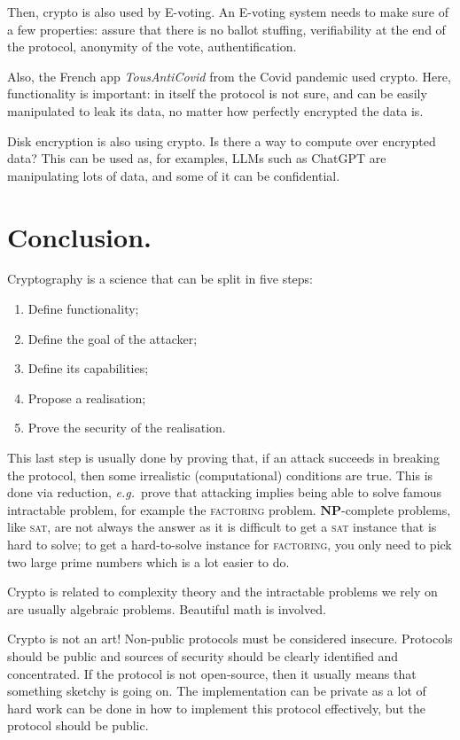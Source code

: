 \documentclass[./main]{subfiles}
\begin{document}
  Then, crypto is also used by E-voting.
  An E-voting system needs to make sure of a few properties:
  assure that there is no ballot stuffing,
  verifiability at the end of the protocol,
  anonymity of the vote,
  authentification.

  Also, the French app \textit{TousAntiCovid} from the Covid pandemic used crypto.
  Here, functionality is important: in itself the protocol is not sure, and can be easily manipulated to leak its data, no matter how perfectly encrypted the data is.

  Disk encryption is also using crypto. Is there a way to compute over encrypted data?
  This can be used as, for examples, LLMs such as ChatGPT are manipulating lots of data, and some of it can be confidential.

  \section{Conclusion.}

  Cryptography is a science that can be split in five steps:
  \begin{enumerate}
    \item Define functionality;
    \item Define the goal of the attacker;
    \item Define its capabilities;
    \item Propose a realisation;
    \item Prove the security of the realisation.
  \end{enumerate}

  This last step is usually done by proving that, if an attack succeeds in breaking the protocol, then some irrealistic (computational) conditions are true.
  This is done via reduction, \textit{e.g.}\ prove that attacking implies being able to solve famous intractable problem, for example the \textsc{factoring} problem.
  $\mathbf{NP}$-complete problems, like \textsc{sat}, are not always the answer as it is difficult to get a \textsc{sat} instance that is hard to solve; to get a hard-to-solve instance for \textsc{factoring}, you only need to pick two large prime numbers which is a lot easier to do.

  Crypto is related to complexity theory and the intractable problems we rely on are usually algebraic problems.
  Beautiful math is involved.

  Crypto is not an art!
  Non-public protocols must be considered insecure.
  Protocols should be public and sources of security should be clearly identified and concentrated.
  If the protocol is not open-source, then it usually means that something sketchy is going on.
  The implementation can be private as a lot of hard work can be done in how to implement this protocol effectively, but the protocol should be public.
\end{document}

